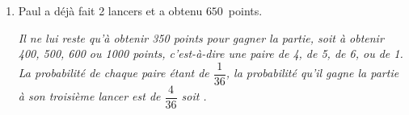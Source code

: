 \begin{enumerate}
\item Paul a déjà fait 2 lancers et a obtenu $650$~points.
 
\textit{Il ne lui reste qu'à obtenir 350 points pour gagner la partie, soit à obtenir 400, 500, 600 ou 1000 points, c'est-à-dire une paire de 4, de 5, de 6, ou de 1. La probabilité de chaque paire étant de $\dfrac{1}{36}$,  la probabilité qu'il gagne la partie à son troisième lancer est de $\dfrac{4}{36}$ soit .}
 
\end{enumerate}

\vspace{0,5cm}

